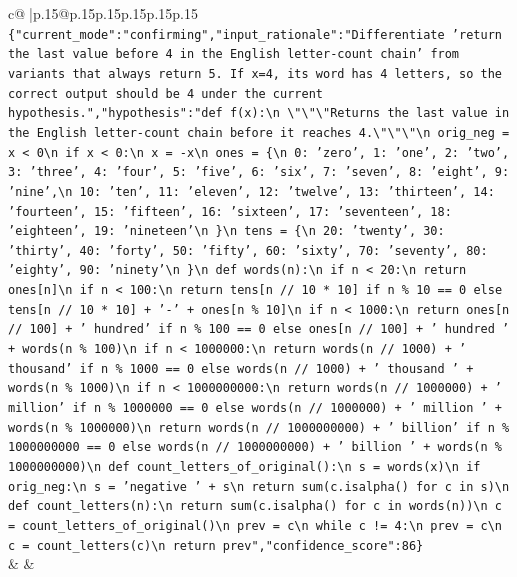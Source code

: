 \documentclass{article}
\begin{document}
{\begin{supertabular}{c@{$\;$}|p{.15\linewidth}@{}p{.15\linewidth}p{.15\linewidth}p{.15\linewidth}p{.15\linewidth}p{.15\linewidth}}
{{{                \texttt{\{"current\_mode":"confirming","input\_rationale":"Differentiate 'return the last value before 4 in the English letter{-}count chain' from variants that always return 5. If x=4, its word has 4 letters, so the correct output should be 4 under the current hypothesis.","hypothesis":"def f(x):\textbackslash{}n    \textbackslash{}"\textbackslash{}"\textbackslash{}"Returns the last value in the English letter{-}count chain before it reaches 4.\textbackslash{}"\textbackslash{}"\textbackslash{}"\textbackslash{}n    orig\_neg = x < 0\textbackslash{}n    if x < 0:\textbackslash{}n        x = {-}x\textbackslash{}n    ones = \{\textbackslash{}n        0: 'zero', 1: 'one', 2: 'two', 3: 'three', 4: 'four', 5: 'five', 6: 'six', 7: 'seven', 8: 'eight', 9: 'nine',\textbackslash{}n        10: 'ten', 11: 'eleven', 12: 'twelve', 13: 'thirteen', 14: 'fourteen', 15: 'fifteen', 16: 'sixteen', 17: 'seventeen', 18: 'eighteen', 19: 'nineteen'\textbackslash{}n    \}\textbackslash{}n    tens = \{\textbackslash{}n        20: 'twenty', 30: 'thirty', 40: 'forty', 50: 'fifty', 60: 'sixty', 70: 'seventy', 80: 'eighty', 90: 'ninety'\textbackslash{}n    \}\textbackslash{}n    def words(n):\textbackslash{}n        if n < 20:\textbackslash{}n            return ones{[}n{]}\textbackslash{}n        if n < 100:\textbackslash{}n            return tens{[}n // 10 * 10{]} if n \% 10 == 0 else tens{[}n // 10 * 10{]} + '{-}' + ones{[}n \% 10{]}\textbackslash{}n        if n < 1000:\textbackslash{}n            return ones{[}n // 100{]} + ' hundred' if n \% 100 == 0 else ones{[}n // 100{]} + ' hundred ' + words(n \% 100)\textbackslash{}n        if n < 1000000:\textbackslash{}n            return words(n // 1000) + ' thousand' if n \% 1000 == 0 else words(n // 1000) + ' thousand ' + words(n \% 1000)\textbackslash{}n        if n < 1000000000:\textbackslash{}n            return words(n // 1000000) + ' million' if n \% 1000000 == 0 else words(n // 1000000) + ' million ' + words(n \% 1000000)\textbackslash{}n        return words(n // 1000000000) + ' billion' if n \% 1000000000 == 0 else words(n // 1000000000) + ' billion ' + words(n \% 1000000000)\textbackslash{}n    def count\_letters\_of\_original():\textbackslash{}n        s = words(x)\textbackslash{}n        if orig\_neg:\textbackslash{}n            s = 'negative ' + s\textbackslash{}n        return sum(c.isalpha() for c in s)\textbackslash{}n    def count\_letters(n):\textbackslash{}n        return sum(c.isalpha() for c in words(n))\textbackslash{}n    c = count\_letters\_of\_original()\textbackslash{}n    prev = c\textbackslash{}n    while c != 4:\textbackslash{}n        prev = c\textbackslash{}n        c = count\_letters(c)\textbackslash{}n    return prev","confidence\_score":86\}} \\
            }
        }
    }
    & & \\ \\


\end{supertabular}}
\end{document}
